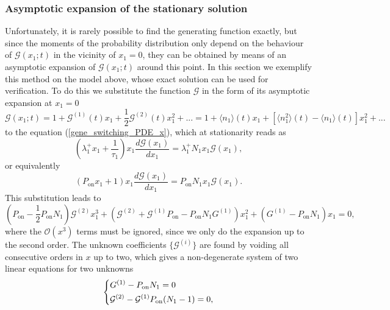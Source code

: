 \documentclass[a4paper, 11pt]{article}
\newcommand{\rem}[2][noinline]{\todo[#1, color=gray!20!white,size=\footnotesize]{\texttt{Rem}: #2}}
\begin{document}
\subsubsection{Asymptotic expansion of the stationary solution} \label{switching_asymptotic_expansion}
Unfortunately, it is rarely possible to find the generating function exactly, but since the moments of the probability distribution only depend on the behaviour of $\mathcal G(x_1;t)$ in the vicinity of $x_1=0$, they can be obtained by means of an asymptotic expansion of $\mathcal G(x_1;t)$ around this point. In this section we exemplify this method on the model above, whose exact solution can be used for verification. To do this we substitute the function $\mathcal G$ in the form of its asymptotic expansion at $x_1=0$
\begin{equation}\label{two_compartment_hopping_expansion}
  \mathcal G(x_1;t) = 1 + \mathcal G^{(1)}(t)x_1 + \frac{1}{2}\mathcal G^{(2)}(t) x_1^2 + ... = 1 + \langle n_1\rangle(t) x_1 + \left[\langle n_1^2 \rangle(t)-\langle n_1\rangle(t)\right]x_1^2 + ...
\end{equation}
to the equation (\ref{gene_switching_PDE_x}), which at stationarity reads as
\begin{equation*}
  (\lambda_1^+x_1 + \frac{1}{\tau_1})x_1\frac{d\mathcal G(x_1)}{dx_1} = \lambda_1^+N_1x_1\mathcal G(x_1),
\end{equation*}
or equivalently
\begin{equation*}
  (P_{\text{on}}x_1 + 1)x_1\frac{d\mathcal G(x_1)}{dx_1} = P_{\text{on}}N_1x_1\mathcal G(x_1).
\end{equation*}
This substitution leads to \rem[]{what is $G^{(1)}$?}
\begin{equation*}
  \left(P_{\text{on}}-\frac{1}{2}P_{\text{on}}N_1\right)\mathcal G^{(2)}x_1^3 + \left(\mathcal G^{(2)} + \mathcal G^{(1)}P_{\text{on}} - P_{\text{on}}N_1G^{(1)}\right)x_1^2 + \left(G^{(1)}-P_{\text{on}}N_1\right)x_1 = 0,
\end{equation*}
where the $\mathcal O(x^3)$ terms must be ignored, since we only do the expansion up to the second order. The unknown coefficients $\{\mathcal G^{(i)}\}$ are found by voiding all consecutive orders in $x$ up to two, which gives a non-degenerate system of two linear equations for two unknowns
\begin{equation*}
  \begin{dcases}
    G^{(1)}-P_{\text{on}}N_1 = 0\\
    \mathcal G^{(2)} - \mathcal G^{(1)}P_{\text{on}}(N_1-1) = 0,
  \end{dcases}
\end{equation*}
\end{document}
